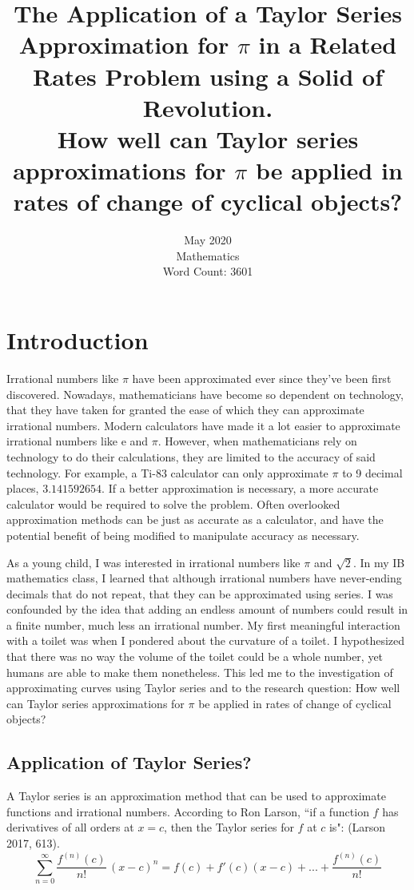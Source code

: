 \documentclass[12pt, titlepage]{article}
\date{\normalsize May 2020 \\ Mathematics \\ Word Count: 3601}
\title{\normalsize The Application of a Taylor Series Approximation for \(\pi\) in a Related Rates Problem using a Solid of Revolution. \bigskip \\  How well can Taylor series approximations for \(\pi\) be applied in rates of change of cyclical objects?}
\begin{document}
\maketitle
\tableofcontents
\newpage

\section{Introduction}
Irrational numbers like \(\pi\) have been approximated ever since they've been first discovered. Nowadays, mathematicians have become so dependent on technology, that they have taken for granted the ease of which they can approximate irrational numbers. Modern calculators have made it a lot easier to approximate irrational numbers like e and \(\pi\). However, when mathematicians rely on technology to do their calculations, they are limited to the accuracy of said technology. For example, a Ti-83 calculator can only approximate \(\pi\) to 9 decimal places, \(3.141592654\). If a better approximation is necessary, a more accurate calculator would be required to solve the problem. Often overlooked approximation methods can be just as accurate as a calculator, and have the potential benefit of being modified to manipulate accuracy as necessary.

As a young child, I was interested in irrational numbers like \(\pi\) and \(\sqrt{2}\). In my IB mathematics class, I learned that although irrational numbers have never-ending decimals that do not repeat, that they can be approximated using series. I was confounded by the idea that adding an endless amount of numbers could result in a finite number, much less an irrational number. My first meaningful interaction with a toilet was when I pondered about the curvature of a toilet. I hypothesized that there was no way the volume of the toilet could be a whole number, yet humans are able to make them nonetheless. This led me to the investigation of approximating curves using Taylor series and to the research question: How well can Taylor series approximations for \(\pi\) be applied in rates of change of cyclical objects?

\subsection{Application of Taylor Series?}
A Taylor series is an approximation method that can be used to approximate functions and irrational numbers. According to Ron Larson, ``if a function \(f\) has derivatives of all orders at \(x = c\), then the Taylor series for \(f\) at \(c\) is": (Larson 2017, 613).
\begin{equation*}
  \sum_{n=0}^{\infty} \frac{f^{(n)}(c)}{n!} \, (x-c)^{n} = f(c) + f'(c)(x-c) + ... +  \frac{f^{(n)}(c)}{n!}
\end{equation*}
\end{document}
